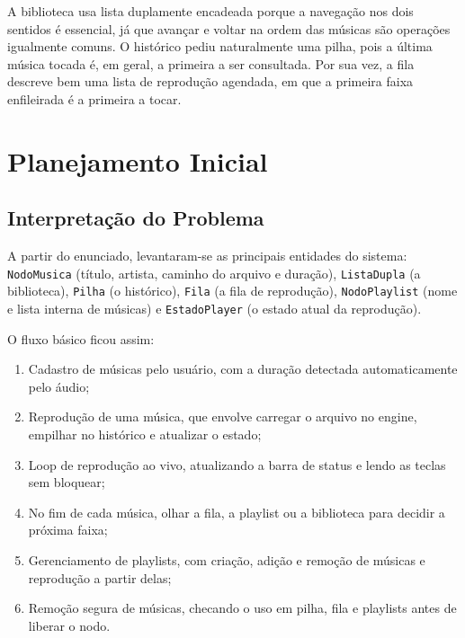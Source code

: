 \documentclass[
    12pt
    ,oneside
    ,a4paper
    ,chapter=TITLE
    ,section=TITLE
    ,sumario=abnt-6027-2012]{abntex2}
\begin{document}
A biblioteca usa lista duplamente encadeada porque a navegação nos dois sentidos é essencial, já que avançar e voltar na ordem das músicas são operações igualmente comuns. O histórico pediu naturalmente uma pilha, pois a última música tocada é, em geral, a primeira a ser consultada. Por sua vez, a fila descreve bem uma lista de reprodução agendada, em que a primeira faixa enfileirada é a primeira a tocar.

\chapter{Planejamento Inicial}
\label{cap:planejamento}

\section{Interpretação do Problema}

A partir do enunciado, levantaram-se as principais entidades do sistema: \texttt{NodoMusica} (título, artista, caminho do arquivo e duração), \texttt{ListaDupla} (a biblioteca), \texttt{Pilha} (o histórico), \texttt{Fila} (a fila de reprodução), \texttt{NodoPlaylist} (nome e lista interna de músicas) e \texttt{EstadoPlayer} (o estado atual da reprodução).

O fluxo básico ficou assim:

\begin{enumerate}
    \item Cadastro de músicas pelo usuário, com a duração detectada automaticamente pelo áudio;
    \item Reprodução de uma música, que envolve carregar o arquivo no engine, empilhar no histórico e atualizar o estado;
    \item Loop de reprodução ao vivo, atualizando a barra de status e lendo as teclas sem bloquear;
    \item No fim de cada música, olhar a fila, a playlist ou a biblioteca para decidir a próxima faixa;
    \item Gerenciamento de playlists, com criação, adição e remoção de músicas e reprodução a partir delas;
    \item Remoção segura de músicas, checando o uso em pilha, fila e playlists antes de liberar o nodo.
\end{enumerate}
\end{document}
